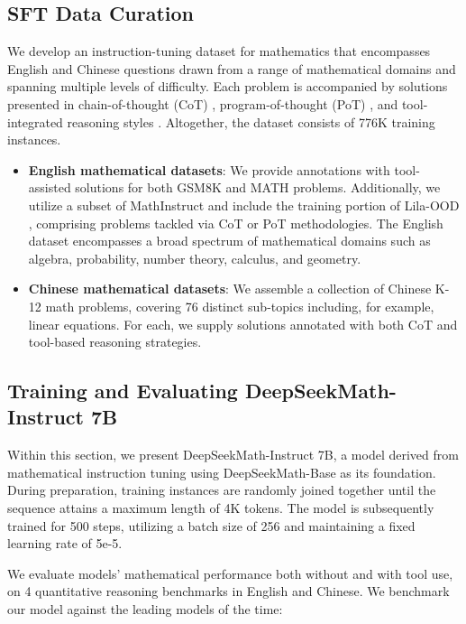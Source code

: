 \begin{itemize}[topsep=0pt]
\subsection{SFT Data Curation}

We develop an instruction-tuning dataset for mathematics that encompasses English and Chinese questions drawn from a range of mathematical domains and spanning multiple levels of difficulty. Each problem is accompanied by solutions presented in chain-of-thought (CoT) \citep{cot}, program-of-thought (PoT) \citep{pot,pal}, and tool-integrated reasoning styles \citep{tora}. Altogether, the dataset consists of 776K training instances.

\begin{itemize}[topsep=0pt]
    \item \textbf{English mathematical datasets}: We provide annotations with tool-assisted solutions for both GSM8K and MATH problems. Additionally, we utilize a subset of MathInstruct \citep{MathInstruct} and include the training portion of Lila-OOD \citep{lila}, comprising problems tackled via CoT or PoT methodologies. The English dataset encompasses a broad spectrum of mathematical domains such as algebra, probability, number theory, calculus, and geometry.
    \item \textbf{Chinese mathematical datasets}: We assemble a collection of Chinese K-12 math problems, covering 76 distinct sub-topics including, for example, linear equations. For each, we supply solutions annotated with both CoT and tool-based reasoning strategies.
\end{itemize}

\subsection{Training and Evaluating DeepSeekMath-Instruct 7B}

Within this section, we present DeepSeekMath-Instruct 7B, a model derived from mathematical instruction tuning using DeepSeekMath-Base as its foundation. During preparation, training instances are randomly joined together until the sequence attains a maximum length of 4K tokens. The model is subsequently trained for 500 steps, utilizing a batch size of 256 and maintaining a fixed learning rate of 5e-5.

We evaluate models' mathematical performance both without and with tool use, on 4 quantitative reasoning benchmarks in English and Chinese. We benchmark our model against the leading models of the time:


\end{itemize}

